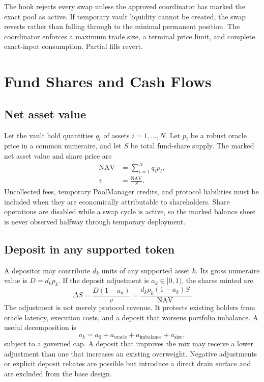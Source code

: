 \documentclass[11pt]{article}
\newcommand{\nav}{\mathrm{NAV}}
\begin{document}
The hook rejects every swap unless the approved coordinator has marked the
exact pool as active. If temporary vault liquidity cannot be created, the swap
reverts rather than falling through to the minimal permanent position. The
coordinator enforces a maximum trade size, a terminal price limit, and complete
exact-input consumption. Partial fills revert.

\section{Fund Shares and Cash Flows}

\subsection{Net asset value}

Let the vault hold quantities $q_i$ of assets $i=1,\ldots,N$. Let $p_i$ be a
robust oracle price in a common numeraire, and let $S$ be total fund-share
supply. The marked net asset value and share price are
\begin{align}
  \nav &= \sum_{i=1}^{N} q_i p_i, \\
  v &= \frac{\nav}{S}.
  \label{eq:nav}
\end{align}
Uncollected fees, temporary PoolManager credits, and protocol liabilities must
be included when they are economically attributable to shareholders. Share
operations are disabled while a swap cycle is active, so the marked balance
sheet is never observed halfway through temporary deployment.

\subsection{Deposit in any supported token}

A depositor may contribute $d_k$ units of any supported asset $k$. Its gross
numeraire value is $D=d_k p_k$. If the deposit adjustment is $a_k\in[0,1)$, the
shares minted are
\begin{equation}
  \Delta S=\frac{D(1-a_k)}{v}
  =\frac{d_k p_k(1-a_k)S}{\nav}.
  \label{eq:deposit}
\end{equation}
The adjustment is not merely protocol revenue. It protects existing holders
from oracle latency, execution costs, and a deposit that worsens portfolio
imbalance. A useful decomposition is
\begin{equation}
  a_k=a_0+a_{\mathrm{oracle}}+a_{\mathrm{imbalance}}+a_{\mathrm{size}},
  \label{eq:depositadjust}
\end{equation}
subject to a governed cap. A deposit that improves the mix may receive a lower
adjustment than one that increases an existing overweight. Negative adjustments
or explicit deposit rebates are possible but introduce a direct drain surface
and are excluded from the base design.
\end{document}
